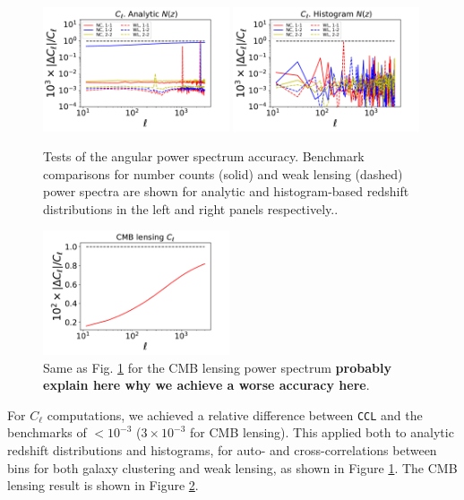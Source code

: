 \documentclass[\docopts]{\docclass}
\newcommand{\ccl}{{\tt CCL}\xspace}
\begin{document}
\begin{figure}
\includegraphics[width=0.49\textwidth]{Cl_analytic}
\includegraphics[width=0.49\textwidth]{Cl_histo}
\caption{Tests of the angular power spectrum accuracy. Benchmark comparisons for number counts (solid) and weak lensing (dashed) power spectra are shown for analytic and histogram-based redshift distributions in the left and right panels respectively..}
\label{fig:cls_limber}
\end{figure}
\begin{figure}
\includegraphics[width=0.49\textwidth]{Cl_cmblens}
\caption{Same as Fig. \ref{fig:cls_limber} for the CMB lensing power spectrum {\bf probably explain here why we achieve a worse accuracy here}.}
\label{fig:cls_cmblens}
\end{figure}

For $C_\ell$ computations, we achieved a relative difference between \ccl and the benchmarks of $<10^{-3}$ ($3\times10^{-3}$ for CMB lensing). This applied both to analytic redshift distributions and histograms, for auto- and cross-correlations between bins for both galaxy clustering and weak lensing, as shown in Figure \ref{fig:cls_limber}. The CMB lensing result is shown in Figure \ref{fig:cls_cmblens}.
\end{document}
